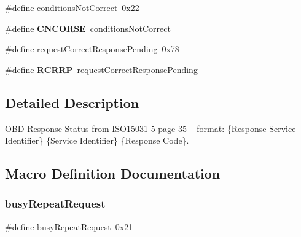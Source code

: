 \begin{DoxyCompactItemize}
\item 
\#define \hyperlink{group__OBD__STATUS_ga0b9b5df5f8a65dc5d1b7f01da28eebc6}{conditions\+Not\+Correct}~0x22
\item 
\mbox{\label{group__OBD__STATUS_ga00c5bb426ca2a8570da70cf19132ed5d}} 
\#define {\bfseries C\+N\+C\+O\+R\+SE}~\hyperlink{group__OBD__STATUS_ga0b9b5df5f8a65dc5d1b7f01da28eebc6}{conditions\+Not\+Correct}
\item 
\#define \hyperlink{group__OBD__STATUS_gac9e616e9eef0db36692dbabb78958b37}{request\+Correct\+Response\+Pending}~0x78
\item 
\mbox{\label{group__OBD__STATUS_ga9c93a6e9425e995822ca7aeb04050981}} 
\#define {\bfseries R\+C\+R\+RP}~\hyperlink{group__OBD__STATUS_gac9e616e9eef0db36692dbabb78958b37}{request\+Correct\+Response\+Pending}
\end{DoxyCompactItemize}


\subsection{Detailed Description}
O\+BD Response Status from I\+S\+O15031-\/5 page 35 ~\newline
format\+: \{Response Service Identifier\} \{Service Identifier\} \{Response Code\}. 



\subsection{Macro Definition Documentation}
\mbox{\label{group__OBD__STATUS_ga6d77101c239804b1292d038157a4ffe2}} 
\subsubsection{\texorpdfstring{busy\+Repeat\+Request}{busyRepeatRequest}}
{\footnotesize\ttfamily \#define busy\+Repeat\+Request~0x21}

